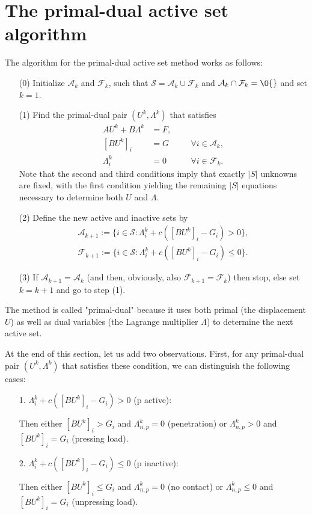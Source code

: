 \documentclass{article}
\begin{document}
\section{The primal-dual active set algorithm}

The algorithm for the primal-dual active set method works as follows:
\begin{itemize}
 \item [(0)] Initialize $\mathcal{A}_k$ and $\mathcal{F}_k$, such that $\mathcal{S}=\mathcal{A}_k\cup\mathcal{F}_k$ and $\mathcal{A}_k\cap\mathcal{F}_k=\O{}$ and set $k=1$.
 \item [(1)] Find the primal-dual pair $(U^k,\Lambda^k)$ that satisfies
 \begin{align*}
  AU^k + B\Lambda^k &= F,\\
  [BU^k]_i &= G\quad&&\forall i\in\mathcal{A}_k,\\
  \Lambda_i^k &= 0\quad&&\forall i\in\mathcal{F}_k.
 \end{align*}
 Note that the second and third conditions imply that exactly $|S|$ unknowns
 are fixed, with the first condition yielding the remaining $|S|$ equations
 necessary to determine both $U$ and $\Lambda$.
 \item [(2)] Define the new active and inactive sets by
 \begin{equation*}
 \begin{split}
  \mathcal{A}_{k+1}:=\lbrace i\in\mathcal{S}:\Lambda^k_i + c([BU^k]_i - G_i)> 0\rbrace,\\
  \mathcal{F}_{k+1}:=\lbrace i\in\mathcal{S}:\Lambda^k_i + c([BU^k]_i - G_i)\leq 0\rbrace.
 \end{split}
 \end{equation*}
 \item [(3)] If $\mathcal{A}_{k+1}=\mathcal{A}_k$ (and then, obviously, also $\mathcal{F}_{k+1}=\mathcal{F}_k$) then stop, else set $k=k+1$ and go to step (1).
\end{itemize}
The method is called "primal-dual" because it uses both primal (the
displacement $U$) as well as dual variables (the Lagrange multiplier
$\Lambda$) to determine the next active set.

At the end of this section, let us add two observations. First,
for any primal-dual pair $(U^k,\Lambda^k)$ that satisfies these
condition, we can distinguish the following cases:
\begin{itemize}
 \item [1.] $\Lambda^k_i + c([BU^k]_i - G_i)> 0$ (p active):

  Then either $[BU^k]_i>G_i$ and $\Lambda^k_{n,p}=0$ (penetration) or $\Lambda^k_{n,p}>0$ and $[BU^k]_i=G_i$ (pressing load).
 \item [2.] $\Lambda^k_i + c([BU^k]_i - G_i)\leq 0$ (p inactive):

  Then either $[BU^k]_i\leq G_i$ and $\Lambda^k_{n,p}=0$ (no contact) or $\Lambda^k_{n,p}\leq0$ and $[BU^k]_i=G_i$ (unpressing load).
\end{itemize}
\end{document}

